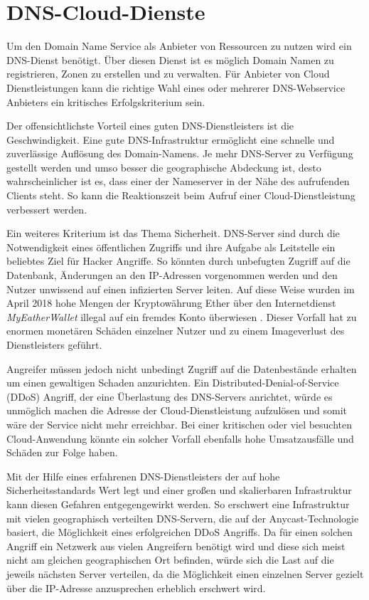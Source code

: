 \section{DNS-Cloud-Dienste}
Um den Domain Name Service als Anbieter von Ressourcen zu nutzen wird ein DNS-Dienst benötigt. Über diesen Dienst ist es möglich Domain Namen zu registrieren, Zonen zu erstellen und zu verwalten. Für Anbieter von Cloud Dienstleistungen kann die richtige Wahl eines oder mehrerer DNS-Webservice Anbieters ein kritisches Erfolgskriterium sein.

Der offensichtlichste Vorteil eines guten DNS-Dienstleisters ist die Geschwindigkeit. Eine gute DNS-Infrastruktur ermöglicht eine schnelle und zuverlässige Auflösung des Domain-Namens. Je mehr DNS-Server zu Verfügung gestellt werden und umso besser die geographische Abdeckung ist, desto wahrscheinlicher ist es, dass einer der Nameserver in der Nähe des aufrufenden Clients steht. So kann die Reaktionszeit beim Aufruf einer Cloud-Dienstleistung verbessert werden. \cite{Stratusly.2017}

Ein weiteres Kriterium ist das Thema Sicherheit. DNS-Server sind durch die Notwendigkeit eines öffentlichen Zugriffs und ihre Aufgabe als Leitstelle ein beliebtes Ziel für Hacker Angriffe. So könnten durch unbefugten Zugriff auf die Datenbank, Änderungen an den IP-Adressen vorgenommen werden und den Nutzer unwissend auf einen infizierten Server leiten. Auf diese Weise wurden im April 2018 hohe Mengen der Kryptowährung Ether über den Internetdienst \textit{MyEatherWallet} illegal auf ein fremdes Konto überwiesen \cite{MEWForce.2018}. Dieser Vorfall hat zu enormen monetären Schäden einzelner Nutzer und zu einem Imageverlust des Dienstleisters geführt. \cite{ZDNet.2018}

Angreifer müssen jedoch nicht unbedingt Zugriff auf die Datenbestände erhalten um einen gewaltigen Schaden anzurichten. Ein Distributed-Denial-of-Service (DDoS) Angriff, der eine Überlastung des DNS-Servers anrichtet, würde es unmöglich machen die Adresse der Cloud-Dienstleistung aufzulösen und somit wäre der Service nicht mehr erreichbar. Bei einer kritischen oder viel besuchten Cloud-Anwendung könnte ein solcher Vorfall ebenfalls hohe Umsatzausfälle und Schäden zur Folge haben.

Mit der Hilfe eines erfahrenen DNS-Dienstleisters der auf hohe Sicherheitsstandards Wert legt und einer großen und skalierbaren Infrastruktur kann diesen Gefahren entgegengewirkt werden. So erschwert eine Infrastruktur mit vielen geographisch verteilten DNS-Servern, die auf der Anycast-Technologie basiert, die Möglichkeit eines erfolgreichen DDoS Angriffs. Da für einen solchen Angriff ein Netzwerk aus vielen Angreifern benötigt wird und diese sich meist nicht am gleichen geographischen Ort befinden, würde sich die Last auf die jeweils nächsten Server verteilen, da die Möglichkeit einen einzelnen Server gezielt über die IP-Adresse anzusprechen erheblich erschwert wird. \cite{Moura.2016}

